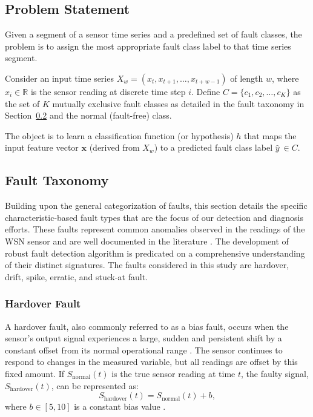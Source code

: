 \subsection{Problem Statement}
Given a segment of a sensor time series and a predefined set of fault classes, the problem is to assign the most appropriate fault class label to that time series segment.

Consider an input time series \(X_w = (x_t, x_{t+1}, \ldots, x_{t+w-1})\) of length \(w\), where \(x_i \in \mathbb{R}\) is the sensor reading at discrete time step \(i\). Define \(C = \{c_1, c_2, \ldots, c_K\}\) as the set of \(K\) mutually exclusive fault classes as detailed in the fault taxonomy in Section~\ref{subsec:types} and the normal (fault-free) class.

The object is to learn a classification function (or hypothesis) \(h\) that maps the input feature vector \(\mathbf{x}\) (derived from \(X_w\)) to a predicted fault class label \(\hat{y}\ \in C\).

\subsection{Fault Taxonomy}
\label{subsec:types}
Building upon the general categorization of faults, this section details the specific characteristic-based fault types that are the focus of our detection and diagnosis efforts. These faults represent common anomalies observed in the readings of the WSN sensor and are well documented in the literature \cite{Saeed2021, Hasan2024, Shi2024, Ni2009}. The development of robust fault detection algorithm is predicated on a comprehensive understanding of their distinct signatures. The faults considered in this study are hardover, drift, spike, erratic, and stuck-at fault.

\subsubsection{Hardover Fault}
A hardover fault, also commonly referred to as a bias fault, occurs when the sensor's output signal experiences a large, sudden and persistent shift by a constant offset from its normal operational range \cite{Saeed2021, Shi2024, Hasan2024}. The sensor continues to respond to changes in the measured variable, but all readings are offset by this fixed amount. If \(S_\text{normal}(t)\) is the true sensor reading at time \(t\), the faulty signal, \(S_\text{hardover}(t)\), can be represented as:
\begin{equation}
S_\text{hardover}(t) = S_\text{normal}(t) + b,
\label{eq:hardover}
\end{equation}
where \(b \in [5, 10]\) is a constant bias value \cite{Saeed2021}.

